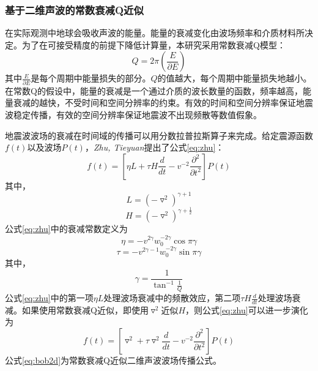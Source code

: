 \subsubsection{基于二维声波的常数衰减Q近似}
在实际观测中地球会吸收声波的能量。能量的衰减变化由波场频率和介质材料所决定。为了在可接受精度的前提下降低计算量，本研究采用常数衰减Q模型\cite{kjartansson1980attenuation}：
\begin{equation}
  Q = 2\pi(\frac{E}{\partial E})
\end{equation}
其中$\frac{E}{\partial E}$是每个周期中能量损失的部分。$Q$的值越大，每个周期中能量损失地越小。在常数Q的假设中，能量的衰减是一个通过介质的波长数量的函数，频率越高，能量衰减的越快，不受时间和空间分辨率的约束。有效的时间和空间分辨率保证地震波稳定传播，有效的空间分辨率保证地震波不出现频散等数值假象。

地震波波场的衰减在时间域的传播可以用分数拉普拉斯算子来完成\cite{zhu2014modeling}。给定震源函数$f(t)$以及波场$P(t)$，\emph{Zhu, Tieyuan}提出了公式\ref{eq:zhu}：
\begin{equation}
  f(t) = \left [ \eta L+\tau H\frac{d}{dt} -v^{-2} \frac{\partial ^2}{\partial t^2}\right ]P(t)
  \label{eq:zhu}
\end{equation}
其中，
\begin{equation}
  L = (-\triangledown ^2)^{\gamma + 1}
\end{equation}
\begin{equation}
  H = (-\triangledown ^2)^{\gamma + \frac{1}{2}}
\end{equation}
公式\ref{eq:zhu}中的衰减常数定义为
\begin{equation}
  \eta = -v^{2\gamma}w_0^{-2\gamma}\cos\pi\gamma
\end{equation}
\begin{equation}
  \tau = -v^{2\gamma-1}w_0^{-2\gamma}\sin\pi\gamma
\end{equation}
其中，
\begin{equation}
  \gamma = \frac{1}{\tan^{-1}\frac{1}{Q}}
\end{equation}
公式\ref{eq:zhu}中的第一项$\eta L$处理波场衰减中的频散效应，第二项$\tau H\frac{d}{dt}$处理波场衰减。如果使用常数衰减Q近似，即使用$\triangledown ^2$近似$H$，则公式\ref{eq:zhu}可以进一步演化为
\begin{equation}
  f(t) = \left [ \triangledown ^2 +\tau \triangledown ^2\frac{d}{dt} -v^{-2} \frac{\partial ^2}{\partial t^2}\right ]P(t)
  \label{eq:bob2d}
\end{equation}
公式\ref{eq:bob2d}为常数衰减Q近似二维声波波场传播公式。

